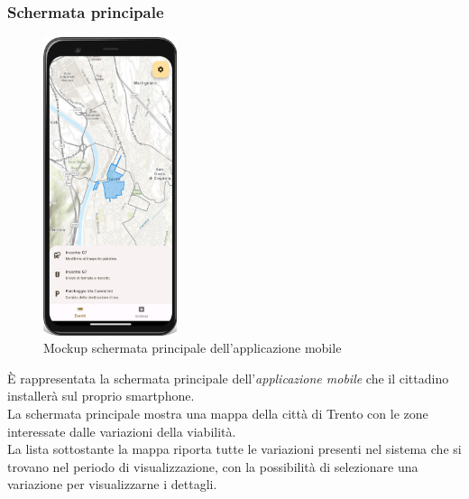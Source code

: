 \documentclass{article}
\begin{document}
\subsubsection{Schermata principale}
\begin{figure}[htbp]
    \label{4.1.1}
    \centering
    \includegraphics[width=0.35\textwidth]{Images/Mockup1 - Mobile.png}
    \caption{Mockup schermata principale dell'applicazione mobile}
\end{figure}

È rappresentata la schermata principale dell'\textit{applicazione mobile} che il cittadino installerà sul proprio smartphone.\\
La schermata principale mostra una mappa della città di Trento con le zone interessate dalle variazioni della viabilità.\\
La lista sottostante la mappa riporta tutte le variazioni presenti nel sistema che si trovano nel periodo di visualizzazione, con la possibilità di selezionare una variazione per visualizzarne i dettagli.\\
\clearpage
\end{document}

